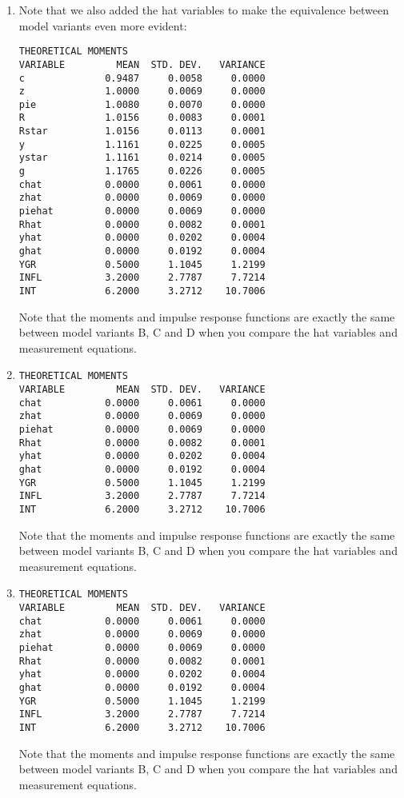 \begin{enumerate}
\item Note that we also added the hat variables to make the equivalence between model variants even more evident:

\begin{verbatim}
THEORETICAL MOMENTS
VARIABLE         MEAN  STD. DEV.   VARIANCE
c              0.9487     0.0058     0.0000
z              1.0000     0.0069     0.0000
pie            1.0080     0.0070     0.0000
R              1.0156     0.0083     0.0001
Rstar          1.0156     0.0113     0.0001
y              1.1161     0.0225     0.0005
ystar          1.1161     0.0214     0.0005
g              1.1765     0.0226     0.0005
chat           0.0000     0.0061     0.0000
zhat           0.0000     0.0069     0.0000
piehat         0.0000     0.0069     0.0000
Rhat           0.0000     0.0082     0.0001
yhat           0.0000     0.0202     0.0004
ghat           0.0000     0.0192     0.0004
YGR            0.5000     1.1045     1.2199
INFL           3.2000     2.7787     7.7214
INT            6.2000     3.2712    10.7006
\end{verbatim}
Note that the moments and impulse response functions are exactly the same between model variants B, C and D
  when you compare the hat variables and measurement equations.

\item 

\begin{verbatim}
THEORETICAL MOMENTS
VARIABLE         MEAN  STD. DEV.   VARIANCE
chat           0.0000     0.0061     0.0000
zhat           0.0000     0.0069     0.0000
piehat         0.0000     0.0069     0.0000
Rhat           0.0000     0.0082     0.0001
yhat           0.0000     0.0202     0.0004
ghat           0.0000     0.0192     0.0004
YGR            0.5000     1.1045     1.2199
INFL           3.2000     2.7787     7.7214
INT            6.2000     3.2712    10.7006
\end{verbatim}
Note that the moments and impulse response functions are exactly the same between model variants B, C and D
  when you compare the hat variables and measurement equations.

\item 

\begin{verbatim}
THEORETICAL MOMENTS
VARIABLE         MEAN  STD. DEV.   VARIANCE
chat           0.0000     0.0061     0.0000
zhat           0.0000     0.0069     0.0000
piehat         0.0000     0.0069     0.0000
Rhat           0.0000     0.0082     0.0001
yhat           0.0000     0.0202     0.0004
ghat           0.0000     0.0192     0.0004
YGR            0.5000     1.1045     1.2199
INFL           3.2000     2.7787     7.7214
INT            6.2000     3.2712    10.7006
\end{verbatim}
Note that the moments and impulse response functions are exactly the same between model variants B, C and D
  when you compare the hat variables and measurement equations.


\end{enumerate}
